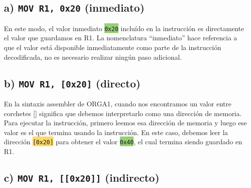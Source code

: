 
\subsection*{a) \lstinline{MOV R1, 0x20} (inmediato)}

\setlength{\columnsep}{-15em}
\begin{multicols}{2}


\columnbreak

En este modo, el valor inmediato \colorbox[HTML]{97D077}{\lstinline{0x20}} incluído en la instrucción es directamente el valor que guardamos en R1. La nomenclatura ``inmediato'' hace referencia a que el valor está disponible inmediatamente como parte de la instrucción decodificada, no es necesario realizar ningún paso adicional.

\end{multicols}

\subsection*{b) \lstinline{MOV R1, [0x20]} (directo)}

\setlength{\columnsep}{10em}
\begin{multicols}{2}


\columnbreak

En la sintaxis assembler de ORGA1, cuando nos encontramos un valor entre corchetes [] significa que debemos interpretarlo como una dirección de memoria. Para ejecutar la instrucción, primero leemos esa dirección de memoria y luego ese valor es el que termina usando la instrucción. En este caso, debemos leer la dirección \colorbox[HTML]{FFD966}{\lstinline{[0x20]}} para obtener el valor \colorbox[HTML]{97D077}{\lstinline{0x40}}, el cual termina siendo guardado en R1.

\end{multicols}

\subsection*{c) \lstinline{MOV R1, [[0x20]]} (indirecto)}

